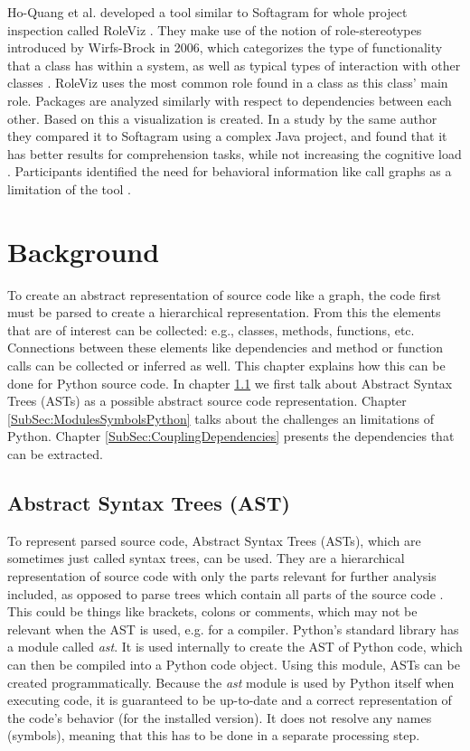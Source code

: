 \documentclass[a4paper,11pt,twoside]{article}
\theoremstyle{definition} %
\renewcommand{\cite}[1]{\citep{#1}}
\begin{document}
Ho-Quang et al. developed a tool similar to Softagram for whole project inspection called RoleViz \cite{ho2019towards}. They make use of the notion of role-stereotypes introduced by Wirfs-Brock in 2006, which categorizes the type of functionality that a class has within a system, as well as typical types of interaction with other classes \cite{1605171}. RoleViz uses the most common role found in a class as this class’ main role. Packages are analyzed similarly with respect to dependencies between each other. Based on this a visualization is created. In a study by the same author they compared it to Softagram using a complex Java project, and found that it has better results for comprehension tasks, while not increasing the cognitive load \cite{truong2019empowering}. Participants identified the need for behavioral information like call graphs as a limitation of the tool \cite{ho2019towards}.

\newpage


\section{Background} \label{Sec:Background}
To create an abstract representation of source code like a graph, the code first must be parsed to create a hierarchical representation. From this the elements that are of interest can be collected: e.g., classes, methods, functions, etc. Connections between these elements like dependencies and method or function calls can be collected or inferred as well. This chapter explains how this can be done for Python source code. In chapter \ref{SubSec:AST} we first talk about Abstract Syntax Trees (ASTs) as a possible abstract source code representation. Chapter \ref{SubSec:ModulesSymbolsPython} talks about the challenges an limitations of Python. Chapter \ref{SubSec:CouplingDependencies} presents the dependencies that can be extracted.


\subsection{Abstract Syntax Trees (AST)} \label{SubSec:AST}

To represent parsed source code, Abstract Syntax Trees (ASTs), which are sometimes just called syntax trees, can be used. They are a hierarchical representation of source code with only the parts relevant for further analysis included, as opposed to parse trees which contain all parts of the source code \cite{cooper-2011}. This could be things like brackets, colons or comments, which may not be relevant when the AST is used, e.g. for a compiler. Python’s standard library has a module called \textit{ast}. It is used internally to create the AST of Python code, which can then be compiled into a Python code object. Using this module, ASTs can be created programmatically. Because the \textit{ast} module is used by Python itself when executing code, it is guaranteed to be up-to-date and a correct representation of the code's behavior (for the installed version). It does not resolve any names (symbols), meaning that this has to be done in a separate processing step.
\end{document}
